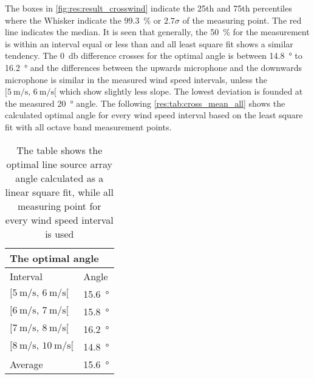  
 

 

The boxes in \autoref{fig:res:result_crosswind} indicate the 25th and 75th percentiles where the Whisker indicate the \SI{99.3}{\percent} or $2.7\sigma$ of the measuring point. The red line indicates the median. It is seen that generally, the \SI{50}{\percent} for the measurement is within an interval equal or less than  and all least square fit shows a similar tendency. The \SI{0}{\decibel} difference crosses for the optimal angle is between \SI{14.8}{\degree} to \SI{16.2}{\degree} and the differences between the upwards microphone and the downwards microphone is similar in the measured wind speed intervals, unless the $[\SI{5}{\meter\per\second},\, \SI{6}{\meter\per\second}[ $ which show slightly less slope. The lowest deviation is founded at the measured \SI{20}{\degree} angle. The following \autoref{res:tab:cross_mean_all} shows the calculated optimal angle for every wind speed interval based on the least square fit with all octave band measurement points.
 
 
 \begin{table}[H]
 \centering
 \caption{The table shows the optimal line source array angle calculated as a linear square fit, while all measuring point for every wind speed interval is used}
\begin{tabular}{l|l}
\multicolumn{2}{l}{The optimal angle}      \\ \hline
Interval & Angle \\ \hline
  $[\SI{5}{\meter\per\second},\, \SI{6}{\meter\per\second}[ $       &   \SI{15.6}{\degree}    \\
   $[\SI{6}{\meter\per\second},\, \SI{7}{\meter\per\second}[ $     &   \SI{15.8}{\degree}     \\
  $[\SI{7}{\meter\per\second},\, \SI{8}{\meter\per\second}[ $       &    \SI{16.2}{\degree}    \\
   $[\SI{8}{\meter\per\second},\, \SI{10}{\meter\per\second}[ $      &     \SI{14.8}{\degree}  \\ \hline
    Average      &     \SI{15.6}{\degree} 
\end{tabular}
\label{res:tab:cross_mean_all}
\end{table}     

